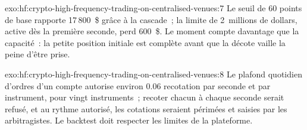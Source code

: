 \begin{solution}{exo:hf:crypto-high-frequency-trading-on-centralised-venues:7}
Le seuil de 60 points de base rapporte 17\,800~\$ grâce à la cascade~; la limite de 2~millions de dollars, active dès la première seconde, perd 600~\$. Le moment compte davantage que
la capacité~: la petite position initiale est complète avant que la décote vaille la peine d'être prise.
\end{solution}

\begin{solution}{exo:hf:crypto-high-frequency-trading-on-centralised-venues:8}
Le plafond quotidien d'ordres d'un compte autorise environ 0.06 recotation par seconde et par instrument, pour vingt instruments~; recoter chacun à chaque seconde serait refusé, et au
rythme autorisé, les cotations seraient périmées et saisies par les arbitragistes. Le backtest doit respecter les limites de la plateforme.
\end{solution}

